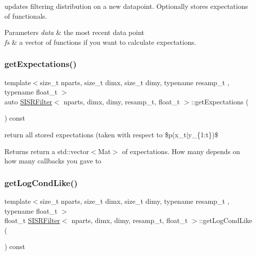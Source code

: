 updates filtering distribution on a new datapoint. Optionally stores expectations of functionals. 


\begin{DoxyParams}{Parameters}
{\em data} & the most recent data point \\
\hline
{\em fs} & a vector of functions if you want to calculate expectations. \\
\hline
\end{DoxyParams}
\mbox{\label{classSISRFilter_a88ef9409ded3ec7e6745e184daad86c4}} 
\subsubsection{\texorpdfstring{get\+Expectations()}{getExpectations()}}
{\footnotesize\ttfamily template$<$size\+\_\+t nparts, size\+\_\+t dimx, size\+\_\+t dimy, typename resamp\+\_\+t , typename float\+\_\+t $>$ \\
auto \hyperlink{classSISRFilter}{S\+I\+S\+R\+Filter}$<$ nparts, dimx, dimy, resamp\+\_\+t, float\+\_\+t $>$\+::get\+Expectations (\begin{DoxyParamCaption}{ }\end{DoxyParamCaption}) const}



return all stored expectations (taken with respect to \$p(x\+\_\+t$\vert$y\+\_\+\{1\+:t\})\$ 

\begin{DoxyReturn}{Returns}
return a std\+::vector$<$\+Mat$>$ of expectations. How many depends on how many callbacks you gave to 
\end{DoxyReturn}
\mbox{\label{classSISRFilter_a48bdb88b2ed4041ab6d8a6547703ebf3}} 
\subsubsection{\texorpdfstring{get\+Log\+Cond\+Like()}{getLogCondLike()}}
{\footnotesize\ttfamily template$<$size\+\_\+t nparts, size\+\_\+t dimx, size\+\_\+t dimy, typename resamp\+\_\+t , typename float\+\_\+t $>$ \\
float\+\_\+t \hyperlink{classSISRFilter}{S\+I\+S\+R\+Filter}$<$ nparts, dimx, dimy, resamp\+\_\+t, float\+\_\+t $>$\+::get\+Log\+Cond\+Like (\begin{DoxyParamCaption}{ }\end{DoxyParamCaption}) const\hspace{0.3cm}{\ttfamily [virtual]}}



